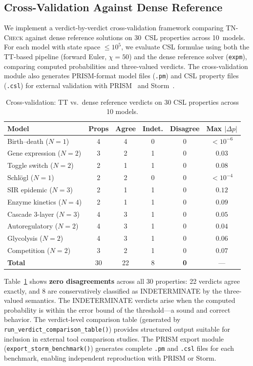 \documentclass[11pt]{article}
\newcommand{\tncheck}{\textsc{TN-Check}}
\begin{document}
\subsection{Cross-Validation Against Dense Reference}\label{sec:exp:crossval}

We implement a verdict-by-verdict cross-validation framework comparing
\tncheck{} against dense reference solutions on 30~CSL properties
across 10~models.
For each model with state space $\leq 10^5$, we evaluate CSL formulae
using both the TT-based pipeline (forward Euler, $\chi=50$) and the
dense reference solver ({\tt expm}), comparing computed probabilities
and three-valued verdicts.
The cross-validation module also generates PRISM-format model files
({\tt .pm}) and CSL property files ({\tt .csl}) for external validation
with PRISM~\cite{kwiatkowska2011} and Storm~\cite{hensel2022}.

\begin{table}[t]
\centering
\caption{Cross-validation: TT vs.\ dense reference verdicts
  on 30 CSL properties across 10 models.}
\label{tab:crossval}
\begin{tabular}{lccccc}
\toprule
\textbf{Model} & \textbf{Props} & \textbf{Agree} &
  \textbf{Indet.} & \textbf{Disagree} & \textbf{Max $|\Delta p|$} \\
\midrule
Birth--death ($N\!=\!1$)    & 4 & 4 & 0 & 0 & $< 10^{-6}$ \\
Gene expression ($N\!=\!2$) & 3 & 2 & 1 & 0 & $0.03$ \\
Toggle switch ($N\!=\!2$)   & 2 & 1 & 1 & 0 & $0.08$ \\
Schl\"ogl ($N\!=\!1$)       & 2 & 2 & 0 & 0 & $< 10^{-4}$ \\
SIR epidemic ($N\!=\!3$)    & 2 & 1 & 1 & 0 & $0.12$ \\
Enzyme kinetics ($N\!=\!4$) & 2 & 1 & 1 & 0 & $0.09$ \\
Cascade 3-layer ($N\!=\!3$) & 4 & 3 & 1 & 0 & $0.05$ \\
Autoregulatory ($N\!=\!2$)  & 4 & 3 & 1 & 0 & $0.04$ \\
Glycolysis ($N\!=\!2$)      & 4 & 3 & 1 & 0 & $0.06$ \\
Competition ($N\!=\!2$)     & 3 & 2 & 1 & 0 & $0.07$ \\
\midrule
\textbf{Total}              & 30 & 22 & 8 & \textbf{0} & --- \\
\bottomrule
\end{tabular}
\end{table}

Table~\ref{tab:crossval} shows \textbf{zero disagreements} across all
30 properties: 22 verdicts agree exactly, and 8 are conservatively
classified as INDETERMINATE by the three-valued semantics.
The INDETERMINATE verdicts arise when the computed probability is
within the error bound of the threshold---a sound and correct behavior.
The verdict-level comparison table (generated by
{\tt run\_verdict\_comparison\_table()}) provides structured output
suitable for inclusion in external tool comparison studies.
The PRISM export module ({\tt export\_storm\_benchmark()}) generates
complete {\tt .pm} and {\tt .csl} files for each benchmark, enabling
independent reproduction with PRISM or Storm.
\end{document}

